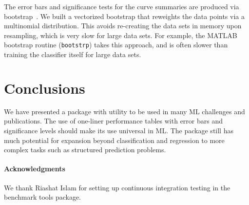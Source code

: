 \documentclass{article}
\newcommand{\code}{\texttt}
\begin{document}
The error bars and significance tests for the curve summaries are produced via bootstrap~\citep{Efron1994}.
We built a vectorized bootstrap that reweights the data points via a multinomial distribution.
This avoids re-creating the data sets in memory upon resampling, which is very slow for large data sets.
For example, the MATLAB bootstrap routine (\code{bootstrp}) takes this approach, and is often slower than training the classifier itself for large data sets.

\section{Conclusions}

We have presented a package with utility to be used in many ML challenges and publications.
The use of one-liner performance tables with error bars and significance levels should make its use universal in ML\@.
The package still has much potential for expansion beyond classification and regression to more complex tasks such as structured prediction problems.

\paragraph{Acknowledgments}
We thank Riashat Islam for setting up continuous integration testing in the benchmark tools package.


\end{document}
